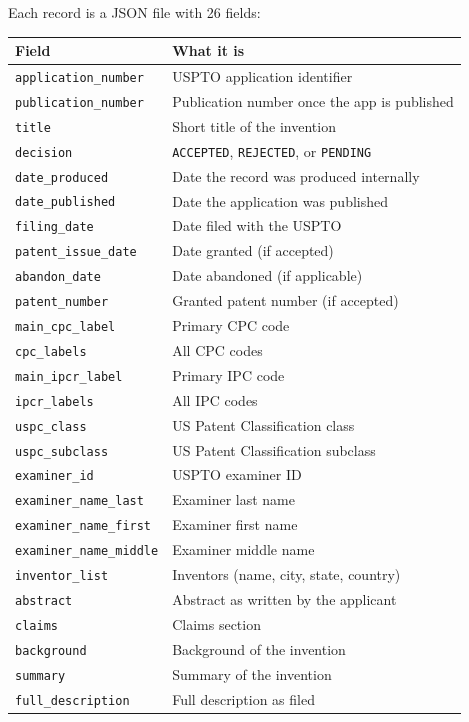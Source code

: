 \documentclass[11pt]{article}
\begin{document}
Each record is a JSON file with 26 fields:

\begin{center}
\small
\begin{tabular}{ll}
  \toprule
  \textbf{Field} & \textbf{What it is} \\
  \midrule
  \texttt{application\_number}   & USPTO application identifier \\
  \texttt{publication\_number}   & Publication number once the app is published \\
  \texttt{title}                 & Short title of the invention \\
  \texttt{decision}              & \texttt{ACCEPTED}, \texttt{REJECTED}, or \texttt{PENDING} \\
  \texttt{date\_produced}        & Date the record was produced internally \\
  \texttt{date\_published}       & Date the application was published \\
  \texttt{filing\_date}          & Date filed with the USPTO \\
  \texttt{patent\_issue\_date}   & Date granted (if accepted) \\
  \texttt{abandon\_date}         & Date abandoned (if applicable) \\
  \texttt{patent\_number}        & Granted patent number (if accepted) \\
  \texttt{main\_cpc\_label}      & Primary CPC code \\
  \texttt{cpc\_labels}           & All CPC codes \\
  \texttt{main\_ipcr\_label}     & Primary IPC code \\
  \texttt{ipcr\_labels}          & All IPC codes \\
  \texttt{uspc\_class}           & US Patent Classification class \\
  \texttt{uspc\_subclass}        & US Patent Classification subclass \\
  \texttt{examiner\_id}          & USPTO examiner ID \\
  \texttt{examiner\_name\_last}  & Examiner last name \\
  \texttt{examiner\_name\_first} & Examiner first name \\
  \texttt{examiner\_name\_middle}& Examiner middle name \\
  \texttt{inventor\_list}        & Inventors (name, city, state, country) \\
  \texttt{abstract}              & Abstract as written by the applicant \\
  \texttt{claims}                & Claims section \\
  \texttt{background}            & Background of the invention \\
  \texttt{summary}               & Summary of the invention \\
  \texttt{full\_description}     & Full description as filed \\
  \bottomrule
\end{tabular}
\end{center}
\end{document}
